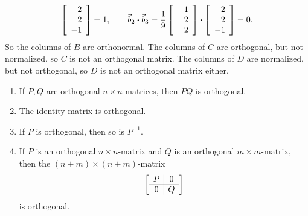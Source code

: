 \documentclass{ximera}
\begin{document}
\begin{solution}
\begin{equation*}
    \startmat{r} 2 \\ 2 \\ -1 \stopmat
    = 1,\qquad
    \vect{b}_2\dotprod \vect{b}_3 =
    \frac{1}{9}
    \startmat{r} -1 \\ 2 \\ 2 \stopmat
    \dotprod
    \startmat{r} 2 \\ 2 \\ -1 \stopmat
    = 0.
  \end{equation*}
  So the columns of $B$ are orthonormal.  The columns of $C$ are
  orthogonal, but not normalized, so $C$ is not an orthogonal
  matrix. The columns of $D$ are normalized, but not orthogonal, so
  $D$ is not an orthogonal matrix either.
\end{solution}

\begin{proposition}\label{prop:properties-orthogonal}

  \begin{enumerate}
  \item\label{item:properties-orthogonal-a}
    If $P,Q$ are orthogonal $n\times n$-matrices, then $PQ$ is
    orthogonal.
  \item The identity matrix is orthogonal.
  \item If $P$ is orthogonal, then so is $P^{-1}$.
  \item\label{item:properties-orthogonal-d}
    If $P$ is an orthogonal $n\times n$-matrix and $Q$ is an
    orthogonal $m\times m$-matrix, then the $(n+m)\times(n+m)$-matrix
    \begin{equation*}
      \startmat{c|c}
        P & 0 \\\hline
        0 & Q
      \stopmat
    \end{equation*}
    is orthogonal.
    \end{enumerate}

\end{proposition}
\end{document}
